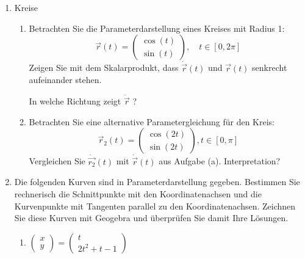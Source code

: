 \clearpage
\begin{ueb}
    {}{}

    \begin{enumerate}
        \item Kreise
              \begin{enumerate}
                  \item Betrachten Sie die Parameterdarstellung eines Kreises mit Radius 1: \[\vec{r}(t) = \begin{pmatrix}
                                \cos(t) \\ \sin(t)
                            \end{pmatrix} , \quad t \in [0, 2\pi] \]
                        Zeigen Sie mit dem Skalarprodukt, dass \(\dot{\vec{r}} (t)\) und \(\vec{r}(t)\) senkrecht aufeinander stehen.

                        In welche Richtung zeigt \(\ddot {\vec{r}}\) ?
                  \item Betrachten Sie eine alternative Parametergleichung für den Kreis:
                        \[\vec{r}_2(t) = \begin{pmatrix}
                                \cos(2t) \\ \sin(2t)
                            \end{pmatrix} , t \in [0, \pi] \]
                        Vergleichen Sie \(\dot{\vec{r_2}} (t)\) mit \(\dot {\vec{r}} (t)\) aus Aufgabe (a). Interpretation?
              \end{enumerate}


        \item Die folgenden Kurven sind in Parameterdarstellung gegeben. Bestimmen Sie rechnerisch die Schnittpunkte mit den Koordinatenachsen und die Kurvenpunkte mit Tangenten parallel zu den Koordinatenachsen. Zeichnen Sie diese Kurven mit Geogebra und überprüfen Sie damit Ihre Lösungen.

              \begin{enumerate}
                  \item \(\begin{pmatrix}
                            x \\
                            y
                        \end{pmatrix} = \begin{pmatrix}
                            t \\
                            2t^2 + t - 1
                        \end{pmatrix}\)


\end{enumerate}
\end{enumerate}
\end{ueb}
